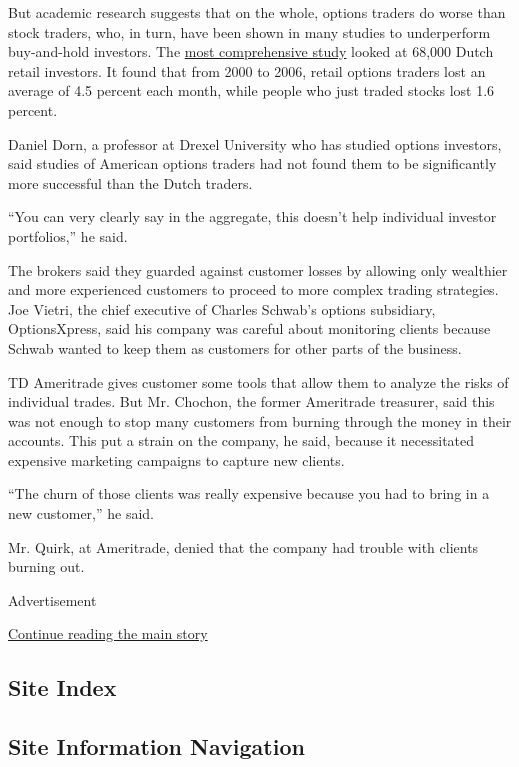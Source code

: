 But academic research suggests that on the whole, options traders do
worse than stock traders, who, in turn, have been shown in many studies
to underperform buy-and-hold investors. The
\href{http://papers.ssrn.com/sol3/papers.cfm?abstract_id=965810}{most
comprehensive study} looked at 68,000 Dutch retail investors. It found
that from 2000 to 2006, retail options traders lost an average of 4.5
percent each month, while people who just traded stocks lost 1.6
percent.

Daniel Dorn, a professor at Drexel University who has studied options
investors, said studies of American options traders had not found them
to be significantly more successful than the Dutch traders.

``You can very clearly say in the aggregate, this doesn't help
individual investor portfolios,'' he said.

The brokers said they guarded against customer losses by allowing only
wealthier and more experienced customers to proceed to more complex
trading strategies. Joe Vietri, the chief executive of Charles Schwab's
options subsidiary, OptionsXpress, said his company was careful about
monitoring clients because Schwab wanted to keep them as customers for
other parts of the business.

TD Ameritrade gives customer some tools that allow them to analyze the
risks of individual trades. But Mr. Chochon, the former Ameritrade
treasurer, said this was not enough to stop many customers from burning
through the money in their accounts. This put a strain on the company,
he said, because it necessitated expensive marketing campaigns to
capture new clients.

``The churn of those clients was really expensive because you had to
bring in a new customer,'' he said.

Mr. Quirk, at Ameritrade, denied that the company had trouble with
clients burning out.

Advertisement

\protect\hyperlink{after-bottom}{Continue reading the main story}

\hypertarget{site-index}{%
\subsection{Site Index}\label{site-index}}

\hypertarget{site-information-navigation}{%
\subsection{Site Information
Navigation}\label{site-information-navigation}}

